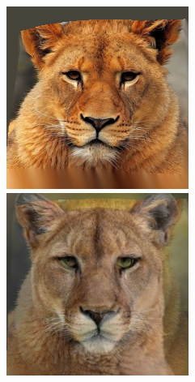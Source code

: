\documentclass[conference]{IEEEtran}
\begin{document}
\begin{figure}[H]
\begin{multicols}{3}
    \centering
    \includegraphics[width=1.0\linewidth]{results/cats/G/img01.png} \par
    \includegraphics[width=1.0\linewidth]{results/cats/G/img30.png} \par
    

\end{multicols}
\end{figure}
\end{document}
